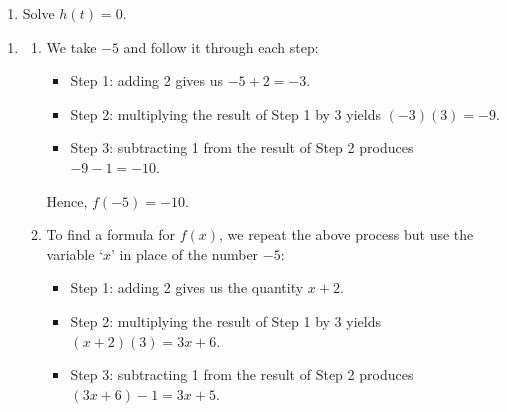 \documentclass{ximera}
\begin{document}
\begin{example}
\begin{enumerate}
\begin{enumerate}
\begin{enumerate}
\item  $h(2x)$ and $2 h(x)$.

\item $h(t + 2)$, $h(t) + 2$ and $h(t) + h(2)$.

\end{enumerate}

\item  Solve $h(t) = 0$.

\end{enumerate}

\end{enumerate}

\begin{explanation}

\begin{enumerate}

\item 

\begin{enumerate}

\item We take $-5$ and follow it through each step:


\begin{itemize}

\item Step 1:  adding 2 gives us  $-5+2 = -3$.

\item Step 2:  multiplying the result of Step 1 by 3 yields  $(-3)(3) = -9$.

\item Step 3:  subtracting 1 from the result of Step 2 produces  $-9-1 = -10$.

\end{itemize}

Hence, $f(-5) = -10$.

\item  To find a formula for $f(x)$, we repeat the above process but use the variable `$x$' in place of the number $-5$:


\begin{itemize}

\item Step 1:  adding 2 gives us the quantity  $x+2$.

\item Step 2:  multiplying the result of Step 1 by 3 yields $(x+2)(3) = 3x+6$.

\item Step 3:  subtracting 1 from the result of Step 2 produces  $(3x+6) - 1 = 3x+5$.


\end{itemize}
\end{enumerate}
\end{enumerate}
\end{explanation}
\end{example}
\end{document}
